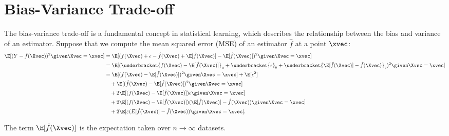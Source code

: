 \section{Bias-Variance Trade-off}

The bias-variance trade-off is a fundamental concept in statistical learning, which describes the relationship between the bias and variance of an estimator. Suppose that we compute the mean squared error (MSE) of an estimator $\hat{f}$ at a point $\xvec$:
\begin{equation}\label{eq:bias-variance-tradeoff}
    \begin{aligned}
        \E[(Y - \hat{f}(\Xvec))^2 \given \Xvec = \xvec] & = \E[(f(\Xvec) + \epsilon - \hat{f}(\Xvec) + \E[\hat{f}(\Xvec)] - \E[\hat{f}(\Xvec)])^2\given \Xvec = \xvec]                                                    \\
                                                        & = \E[(\underbracket{f(\Xvec) - \E[\hat{f}(\Xvec)]}_a + \underbracket{\epsilon}_b + \underbracket{\E[\hat{f}(\Xvec)] - \hat{f}(\Xvec)}_c)^2\given \Xvec = \xvec] \\
                                                        & = \E[(f(\Xvec) - \E[\hat{f}(\Xvec)])^2\given \Xvec = \xvec] + \E[\epsilon^2]                                                                                    \\
                                                        & \quad + \E[(\hat{f}(\Xvec) - \E[\hat{f}(\Xvec)])^2\given \Xvec = \xvec]                                                                                         \\
                                                        & \quad + 2\E[(f(\Xvec) - \E[\hat{f}(\Xvec)])\epsilon\given \Xvec = \xvec]                                                                                        \\
                                                        & \quad + 2\E[(f(\Xvec) - \E[\hat{f}(\Xvec)])(\E[\hat{f}(\Xvec)] - \hat{f}(\Xvec))\given \Xvec = \xvec]                                                           \\
                                                        & \quad + 2\E[\varepsilon(E[\hat{f}(\Xvec)] - \hat{f}(\Xvec))\given \Xvec = \xvec].
    \end{aligned}
\end{equation}
\begin{note}
    The term $\E[\hat{f}(\Xvec)]$ is the expectation taken over $n \to \infty$ datasets.
\end{note}

